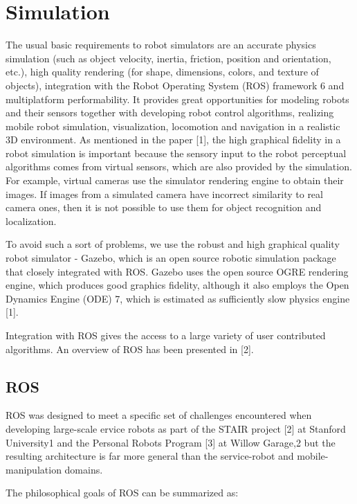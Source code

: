\chapter{Simulation} 


The usual basic requirements to robot simulators are an accurate physics simulation (such as object velocity, inertia, friction, position and orientation, etc.), high quality rendering (for shape, dimensions, colors, and texture of objects), integration with the Robot Operating System (ROS) framework 6 and multiplatform performability. It provides great opportunities for modeling robots and their sensors together with developing robot control algorithms, realizing mobile robot simulation, visualization, locomotion and navigation in a realistic 3D environment. As mentioned in the paper [1], the high graphical fidelity in a robot simulation is important because the sensory input to the robot perceptual algorithms comes from virtual sensors, which are also provided by the simulation. For example, virtual cameras use the simulator rendering engine to obtain their images. If images from a simulated camera have incorrect similarity to real camera ones, then it is not possible to use them for object recognition and localization.

To avoid such a sort of problems, we use the robust and high graphical quality robot simulator - Gazebo, which is an open source robotic simulation package that closely integrated with ROS. Gazebo uses the open source OGRE rendering engine, which produces good graphics fidelity, although it also employs the Open Dynamics Engine (ODE) 7, which is estimated as sufficiently slow physics engine [1].

Integration with ROS gives the access to a large variety of user contributed algorithms. An overview of ROS has been presented in [2].

\section{ROS}

ROS was designed to meet a specific set of challenges encountered when developing large-scale ervice robots as part of the STAIR project [2] at Stanford University1 and the Personal Robots Program [3] at Willow Garage,2 but the resulting architecture is far more general than the service-robot and mobile-manipulation domains.

The philosophical goals of ROS can be summarized as:

